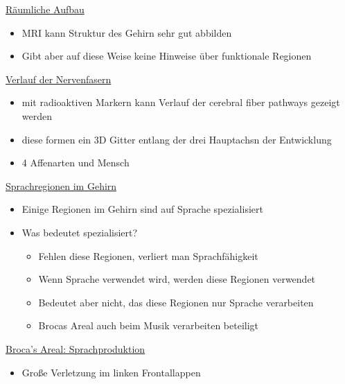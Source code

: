 \documentclass[a4paper,10pt,oneside]{article}
\begin{document}
\underline{Räumliche Aufbau} \\
	\begin{itemize}
		\item MRI kann Struktur des Gehirn sehr gut abbilden
		\item Gibt aber auf diese Weise keine Hinweise über funktionale Regionen
	\end{itemize}
	
\underline{Verlauf der Nervenfasern} \\
	\begin{itemize}
		\item mit radioaktiven Markern kann Verlauf der cerebral fiber pathways gezeigt werden
		\item diese formen ein 3D Gitter entlang der drei Hauptachsn der Entwicklung 
		\item 4 Affenarten und Mensch
	\end{itemize}
	
\underline{Sprachregionen im Gehirn} \\
	\begin{itemize}
		\item Einige Regionen im Gehirn sind auf Sprache spezialisiert
		\item Was bedeutet spezialisiert?
			\begin{itemize}
				\item Fehlen diese Regionen, verliert man Sprachfähigkeit
				\item Wenn Sprache verwendet wird, werden diese Regionen verwendet
				\item Bedeutet aber nicht, das diese Regionen nur Sprache verarbeiten
				\item Brocas Areal auch beim Musik verarbeiten beteiligt
			\end{itemize}
	\end{itemize}

\underline{Broca's Areal: Sprachproduktion} \\
	\begin{itemize}
		\item Große Verletzung im linken Frontallappen
	\end{itemize}
	
\end{document}
